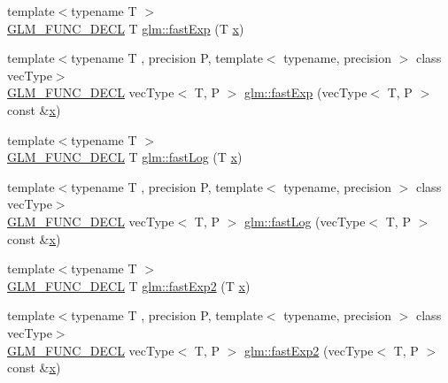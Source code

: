 \begin{DoxyCompactItemize}
\item 
{\footnotesize template$<$typename T $>$ }\\\mbox{\hyperlink{setup_8hpp_ab2d052de21a70539923e9bcbf6e83a51}{G\+L\+M\+\_\+\+F\+U\+N\+C\+\_\+\+D\+E\+CL}} T \mbox{\hyperlink{group__gtx__fast__exponential_gaa3180ac8f96ab37ab96e0cacaf608e10}{glm\+::fast\+Exp}} (T \mbox{\hyperlink{glad_8h_a92d0386e5c19fb81ea88c9f99644ab1d}{x}})
\item 
{\footnotesize template$<$typename T , precision P, template$<$ typename, precision $>$ class vec\+Type$>$ }\\\mbox{\hyperlink{setup_8hpp_ab2d052de21a70539923e9bcbf6e83a51}{G\+L\+M\+\_\+\+F\+U\+N\+C\+\_\+\+D\+E\+CL}} vec\+Type$<$ T, P $>$ \mbox{\hyperlink{group__gtx__fast__exponential_ga4faf0b61115de36efcf47c4ecb55a5fa}{glm\+::fast\+Exp}} (vec\+Type$<$ T, P $>$ const \&\mbox{\hyperlink{glad_8h_a92d0386e5c19fb81ea88c9f99644ab1d}{x}})
\item 
{\footnotesize template$<$typename T $>$ }\\\mbox{\hyperlink{setup_8hpp_ab2d052de21a70539923e9bcbf6e83a51}{G\+L\+M\+\_\+\+F\+U\+N\+C\+\_\+\+D\+E\+CL}} T \mbox{\hyperlink{group__gtx__fast__exponential_gae1bdc97b7f96a600e29c753f1cd4388a}{glm\+::fast\+Log}} (T \mbox{\hyperlink{glad_8h_a92d0386e5c19fb81ea88c9f99644ab1d}{x}})
\item 
{\footnotesize template$<$typename T , precision P, template$<$ typename, precision $>$ class vec\+Type$>$ }\\\mbox{\hyperlink{setup_8hpp_ab2d052de21a70539923e9bcbf6e83a51}{G\+L\+M\+\_\+\+F\+U\+N\+C\+\_\+\+D\+E\+CL}} vec\+Type$<$ T, P $>$ \mbox{\hyperlink{group__gtx__fast__exponential_ga789abcbc34d08008d2f5a4547dd6e5e3}{glm\+::fast\+Log}} (vec\+Type$<$ T, P $>$ const \&\mbox{\hyperlink{glad_8h_a92d0386e5c19fb81ea88c9f99644ab1d}{x}})
\item 
{\footnotesize template$<$typename T $>$ }\\\mbox{\hyperlink{setup_8hpp_ab2d052de21a70539923e9bcbf6e83a51}{G\+L\+M\+\_\+\+F\+U\+N\+C\+\_\+\+D\+E\+CL}} T \mbox{\hyperlink{group__gtx__fast__exponential_ga0af50585955eb14c60bb286297fabab2}{glm\+::fast\+Exp2}} (T \mbox{\hyperlink{glad_8h_a92d0386e5c19fb81ea88c9f99644ab1d}{x}})
\item 
{\footnotesize template$<$typename T , precision P, template$<$ typename, precision $>$ class vec\+Type$>$ }\\\mbox{\hyperlink{setup_8hpp_ab2d052de21a70539923e9bcbf6e83a51}{G\+L\+M\+\_\+\+F\+U\+N\+C\+\_\+\+D\+E\+CL}} vec\+Type$<$ T, P $>$ \mbox{\hyperlink{group__gtx__fast__exponential_ga9e6219327b7a33077dbec7620d981fff}{glm\+::fast\+Exp2}} (vec\+Type$<$ T, P $>$ const \&\mbox{\hyperlink{glad_8h_a92d0386e5c19fb81ea88c9f99644ab1d}{x}})

\end{DoxyCompactItemize}
